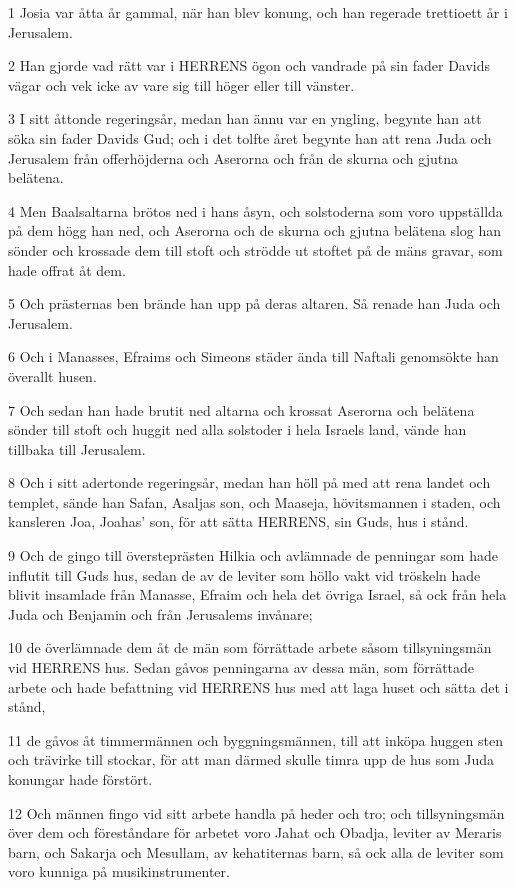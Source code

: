 \par 1 Josia var åtta år gammal, när han blev konung, och han regerade trettioett år i Jerusalem.
\par 2 Han gjorde vad rätt var i HERRENS ögon och vandrade på sin fader Davids vägar och vek icke av vare sig till höger eller till vänster.
\par 3 I sitt åttonde regeringsår, medan han ännu var en yngling, begynte han att söka sin fader Davids Gud; och i det tolfte året begynte han att rena Juda och Jerusalem från offerhöjderna och Aserorna och från de skurna och gjutna belätena.
\par 4 Men Baalsaltarna brötos ned i hans åsyn, och solstoderna som voro uppställda på dem högg han ned, och Aserorna och de skurna och gjutna belätena slog han sönder och krossade dem till stoft och strödde ut stoftet på de mäns gravar, som hade offrat åt dem.
\par 5 Och prästernas ben brände han upp på deras altaren. Så renade han Juda och Jerusalem.
\par 6 Och i Manasses, Efraims och Simeons städer ända till Naftali genomsökte han överallt husen.
\par 7 Och sedan han hade brutit ned altarna och krossat Aserorna och belätena sönder till stoft och huggit ned alla solstoder i hela Israels land, vände han tillbaka till Jerusalem.
\par 8 Och i sitt adertonde regeringsår, medan han höll på med att rena landet och templet, sände han Safan, Asaljas son, och Maaseja, hövitsmannen i staden, och kansleren Joa, Joahas' son, för att sätta HERRENS, sin Guds, hus i stånd.
\par 9 Och de gingo till översteprästen Hilkia och avlämnade de penningar som hade influtit till Guds hus, sedan de av de leviter som höllo vakt vid tröskeln hade blivit insamlade från Manasse, Efraim och hela det övriga Israel, så ock från hela Juda och Benjamin och från Jerusalems invånare;
\par 10 de överlämnade dem åt de män som förrättade arbete såsom tillsyningsmän vid HERRENS hus. Sedan gåvos penningarna av dessa män, som förrättade arbete och hade befattning vid HERRENS hus med att laga huset och sätta det i stånd,
\par 11 de gåvos åt timmermännen och byggningsmännen, till att inköpa huggen sten och trävirke till stockar, för att man därmed skulle timra upp de hus som Juda konungar hade förstört.
\par 12 Och männen fingo vid sitt arbete handla på heder och tro; och tillsyningsmän över dem och föreståndare för arbetet voro Jahat och Obadja, leviter av Meraris barn, och Sakarja och Mesullam, av kehatiternas barn, så ock alla de leviter som voro kunniga på musikinstrumenter.

